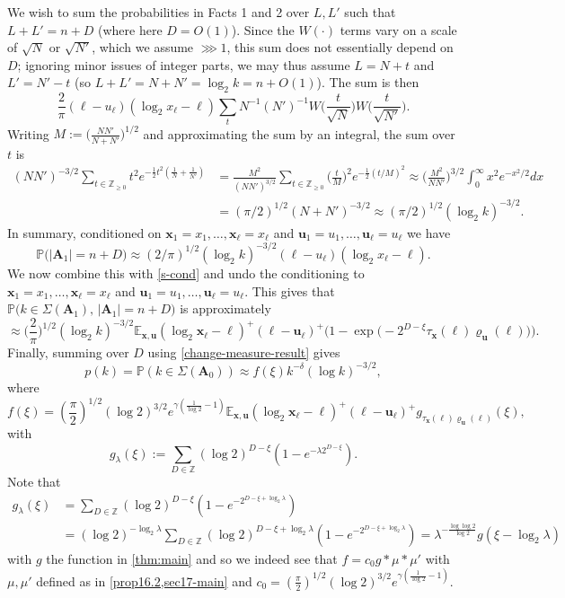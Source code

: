 \documentclass[11pt,reqno]{amsart}
\numberwithin{equation}{section}
\theoremstyle{definition}
\theoremstyle{remark}
\newcommand{\mb}{\mathbb}
\newcommand{\mbf}{\mathbf}
\renewcommand{\ge}{\geqslant}
\newcommand\Z{\mathbb{Z}}
\begin{document}
We wish to sum the probabilities in Facts 1 and 2 over $L, L'$ such that $L + L' = n + D$ (where here $D = O(1)$). Since the $W( \cdot)$ terms vary on a scale of $\sqrt{N}$ or $\sqrt{N'}$, which we assume $\ggg 1$, this sum does not essentially depend on $D$; ignoring minor issues of integer parts, we may thus assume $L = N + t$ and $L' = N' - t$ (so $L + L' = N + N' = \log_2 k = n + O(1)$). The sum is then 
\[ \frac{2}{\pi} (\ell - u_\ell) (\log_2 x_{\ell} - \ell) \sum_t N^{-1} (N')^{-1} W\big(\frac{t}{\sqrt{N}}\big) W\big(\frac{t}{\sqrt{N'}}\big).\]
Writing $M := \big(\frac{N N'}{N + N'}\big)^{1/2}$ and approximating the sum by an integral, the sum over $t$ is
\begin{align}\nonumber (NN')^{-3/2} \sum_{t \in \Z_{\ge 0}} t^2 e^{-\frac{1}{2} t^2 (\frac{1}{N} + \frac{1}{N'})} & = \frac{M^2}{(NN')^{3/2}} \sum_{t \in \Z_{\ge 0}} \big(\frac{t}{M}\big)^2 e^{-\frac{1}{2}(t/M)^2} \approx  \big(\frac{M^2}{NN'}\big)^{3/2} \int^{\infty}_0 x^2 e^{-x^2/2} dx \\ & =  (\pi/2)^{1/2} (N + N')^{-3/2} \approx (\pi/2)^{1/2} (\log_2 k)^{-3/2}. \label{coupling-heuristic}\end{align}
In summary, conditioned on $\mbf{x}_1 = x_1,\dots, \mbf{x}_{\ell} = x_{\ell}$ and $\mbf{u}_1 = u_1,\dots, \mbf{u}_{\ell} = u_{\ell}$ we have
\[ \mb{P}\big(|\mbf{A}_1| = n + D\big) \approx (2/\pi)^{1/2}(\log_2 k)^{-3/2} (\ell - u_\ell) (\log_2 x_{\ell} - \ell) .\]
We now combine this with \cref{s-cond} and undo the conditioning to $\mbf{x}_1 = x_1,\dots, \mbf{x}_{\ell} = x_{\ell}$ and $\mbf{u}_1 = u_1,\dots, \mbf{u}_{\ell} = u_{\ell}$. This gives that $\mb{P}\big(k \in \Sigma(\mbf{A}_1) , \,|\mbf{A}_1| = n + D\big)$ is approximately
\[  \approx\big( \frac{2}{\pi}\big)^{1/2}(\log_2 k)^{-3/2} \mb{E}_{\mbf{x}, \mbf{u}} (\log_2 \mbf{x}_{\ell} - \ell)^+ (\ell - \mbf{u}_{\ell})^+ \big(1 - \exp\big({-}2^{D - \xi} \tau_{\mbf{x}}(\ell) \varrho_{\mbf{u}}(\ell)\big)\big) .\]
Finally, summing over $D$ using \cref{change-measure-result} gives
\[ p(k) = \mb{P}(k \in \Sigma(\mbf{A}_0)) \approx  f(\xi) k^{-\delta} (\log k)^{-3/2},\]
where \[ f(\xi) = (\frac{\pi}{2})^{1/2} (\log 2)^{3/2} e^{\gamma(\frac{1}{\log 2} - 1)}\mb{E}_{\mbf{x},\mbf{u}} (\log_2 \mbf{x}_{\ell} - \ell)^+ (\ell - \mbf{u}_{\ell})^+  g_{\tau_{\mbf{x}}(\ell)\varrho_{\mbf{u}}(\ell)}(\xi), \]
with
\[ g_{\lambda}(\xi) := \sum_{D \in \Z} (\log 2)^{D - \xi} (1 -  e^{-\lambda 2^{D - \xi}}).\]
Note that
\begin{align}
g_{\lambda}(\xi)  & = \sum_{D \in \Z} (\log 2)^{D - \xi} (1 -  e^{-2^{D - \xi + \log_2 \lambda}}) \\ & = (\log 2)^{-\log_2\lambda} \sum_{D \in \Z} (\log 2)^{D - \xi + \log_2\lambda} (1 -  e^{-2^{D - \xi + \log_2 \lambda}}) = \lambda^{-\frac{\log \log 2}{\log 2}} g(\xi  -  \log_2\lambda)\label{g-lambda-trans}
\end{align}
with $g$ the function in \cref{thm:main}
and so we indeed see that $f = c_0 g \ast \mu \ast \mu'$ with $\mu, \mu'$ defined as in \cref{prop16.2,sec17-main} and $c_0 = (\frac{\pi}{2})^{1/2} (\log 2)^{3/2} e^{\gamma(\frac{1}{\log 2} - 1)}$.
\end{document}

